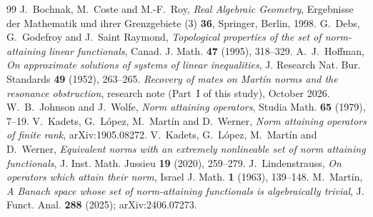 \documentclass[10pt]{amsart}
\theoremstyle{definition}
\theoremstyle{remark}
\begin{document}
\begin{thebibliography}{99}
J.~Bochnak, M.~Coste and M.-F.~Roy, \emph{Real Algebraic Geometry},
Ergebnisse der Mathematik und ihrer Grenzgebiete (3) \textbf{36},
Springer, Berlin, 1998.
G.~Debs, G.~Godefroy and J.~Saint Raymond,
\emph{Topological properties of the set of norm-attaining linear
functionals}, Canad. J. Math. \textbf{47} (1995), 318--329.
A.~J.~Hoffman, \emph{On approximate solutions of systems of linear
inequalities}, J. Research Nat. Bur. Standards \textbf{49} (1952),
263--265.
\emph{Recovery of mates on Mart\'in norms and the resonance obstruction},
research note (Part~I of this study), October 2026.
W.~B.~Johnson and J.~Wolfe, \emph{Norm attaining operators},
Studia Math. \textbf{65} (1979), 7--19.
V.~Kadets, G.~L\'opez, M.~Mart\'in and D.~Werner,
\emph{Norm attaining operators of finite rank}, arXiv:1905.08272.
V.~Kadets, G.~L\'opez, M.~Mart\'in and D.~Werner,
\emph{Equivalent norms with an extremely nonlineable set of norm attaining
functionals}, J. Inst. Math. Jussieu \textbf{19} (2020), 259--279.
J.~Lindenstrauss, \emph{On operators which attain their norm}, Israel J.
Math. \textbf{1} (1963), 139--148.
M.~Mart\'in,
\emph{A Banach space whose set of norm-attaining functionals is
algebraically trivial}, J. Funct. Anal. \textbf{288} (2025);
arXiv:2406.07273.
\end{thebibliography}
\end{document}
